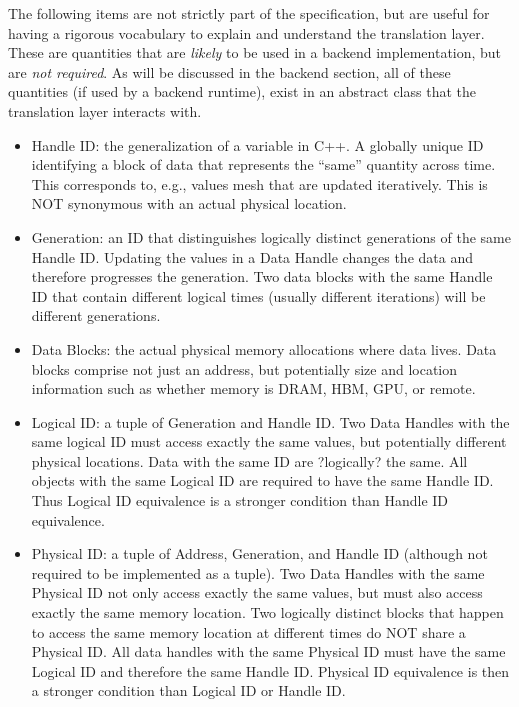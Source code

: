 The following items are not strictly part of the specification, but are useful for having a rigorous vocabulary to explain and understand the translation layer.
These are quantities that are \emph{likely} to be used in a backend implementation, but are \emph{not required}.
As will be discussed in the backend section, all of these quantities (if used by a backend runtime),
exist in an abstract class  that the translation layer interacts with.
\begin{itemize}
\item Handle ID: the generalization of a variable in C++. A globally unique ID identifying a block of data that represents the ``same'' quantity across time.  
This corresponds to, e.g., values mesh that are updated iteratively.  
This is NOT synonymous with an actual physical location.
\item Generation: an ID that distinguishes logically distinct generations of the same Handle ID. 
Updating the values in a Data Handle changes the data and therefore progresses the generation. 
Two data blocks with the same Handle ID that contain different logical times (usually different iterations) will be different generations.
\item Data Blocks: the actual physical memory allocations where data lives. 
Data blocks comprise not just an address, but potentially size and location information such as whether memory is DRAM, HBM, GPU, or remote.
\item Logical ID: a tuple of Generation and Handle ID. 
Two Data Handles with the same logical ID must access exactly the same values, but potentially different physical locations. 
Data with the same ID are ?logically?  the same. 
All objects with the same Logical ID are required to have the same Handle ID.
Thus Logical ID equivalence is a stronger condition than Handle ID equivalence.
\item Physical ID: a tuple of Address, Generation, and Handle ID (although not required to be implemented as a tuple). 
Two Data Handles with the same Physical ID not only access exactly the same values, but must also access exactly the same memory location. 
Two logically distinct blocks that happen to access the same memory location at different times do NOT share a Physical ID. 
All data handles with the same Physical ID must have the same Logical ID and therefore the same Handle ID. 
Physical ID equivalence is then a stronger condition than Logical ID or Handle ID.
\end{itemize}

